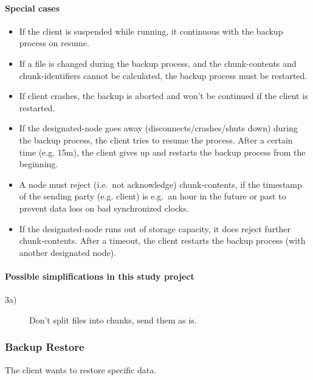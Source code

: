 \paragraph{Special cases}
\begin{itemize}
    \item If the \gls{client} is suspended while running, it continuous with the backup process on resume. %
    \item If a \gls{file} is changed during the backup process, and the \glspl{chunk-content} and \glspl{chunk-identifier} cannot be calculated, the backup process must be restarted. %
    \item If \gls{client} crashes, the backup is aborted and won't be continued if the \gls{client} is restarted.
    \item If the \gls{designated-node} goes away (disconnects/crashes/shuts down) during the backup process, the \gls{client} tries to resume the process. After a certain time (e.g. 15m), the \gls{client} gives up and restarts the backup process from the beginning.
    \item A \gls{node} must reject (i.e.\ not acknowledge) \glspl{chunk-content}, if the timestamp of the sending party (e.g. \gls{client}) is e.g.\ an hour in the future or past to prevent data loss on bad synchronized clocks.
    \item If the \gls{designated-node} runs out of storage capacity, it does reject further \glspl{chunk-content}. After a timeout, the client restarts the backup process (with another designated node).
\end{itemize}

\paragraph{Possible simplifications in this study project}
\begin{description}
    \item[3a)] Don't split files into chunks, send them as is.
\end{description}

\subsubsection{Backup Restore}\label{sec:scenario-backup-restore}
The client wants to restore specific data.

